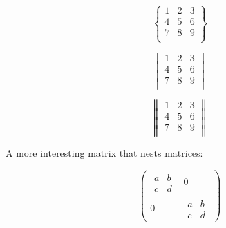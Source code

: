 \documentclass[]{article}
\begin{document}
\[
\begin{Bmatrix}
1 & 2 & 3 \\
4 & 5 & 6 \\
7 & 8 & 9 \\
\end{Bmatrix}
\]

\[
\begin{vmatrix}
1 & 2 & 3 \\
4 & 5 & 6 \\
7 & 8 & 9 \\
\end{vmatrix}
\]

\[
\begin{Vmatrix}
1 & 2 & 3 \\
4 & 5 & 6 \\
7 & 8 & 9 \\
\end{Vmatrix}
\]

A more interesting matrix that nests matrices:

\[
\begin{pmatrix}
\begin{matrix}
a & b \\
c & d
\end{matrix} & 0 \\
0 & \begin{matrix}
a & b \\
c & d
\end{matrix}
\end{pmatrix}
\]
\end{document}
